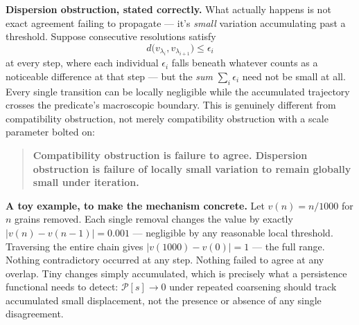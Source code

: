 \textbf{Dispersion obstruction, stated correctly.} What actually happens is
not exact agreement failing to propagate --- it's \emph{small} variation
accumulating past a threshold. Suppose consecutive resolutions satisfy
\[d\big(v_{\lambda_i}, v_{\lambda_{i+1}}\big) \leq \epsilon_i\]
at every step, where each individual \(\epsilon_i\) falls beneath whatever
counts as a noticeable difference at that step --- but the \emph{sum}
\(\sum_i \epsilon_i\) need not be small at all. Every single transition can
be locally negligible while the accumulated trajectory crosses the
predicate's macroscopic boundary. This is genuinely different from
compatibility obstruction, not merely compatibility obstruction with a
scale parameter bolted on:

\begin{quote}
\textbf{Compatibility obstruction is failure to agree. Dispersion obstruction
is failure of locally small variation to remain globally small under
iteration.}
\end{quote}

\textbf{A toy example, to make the mechanism concrete.} Let \(v(n) = n/1000\)
for \(n\) grains removed. Each single removal changes the value by exactly
\(|v(n) - v(n-1)| = 0.001\) --- negligible by any reasonable local threshold.
Traversing the entire chain gives \(|v(1000) - v(0)| = 1\) --- the full
range. Nothing contradictory occurred at any step. Nothing failed to
agree at any overlap. Tiny changes simply accumulated, which is precisely
what a persistence functional needs to detect: \(\mathcal{P}[s] \to 0\)
under repeated coarsening should track accumulated small displacement,
not the presence or absence of any single disagreement.

